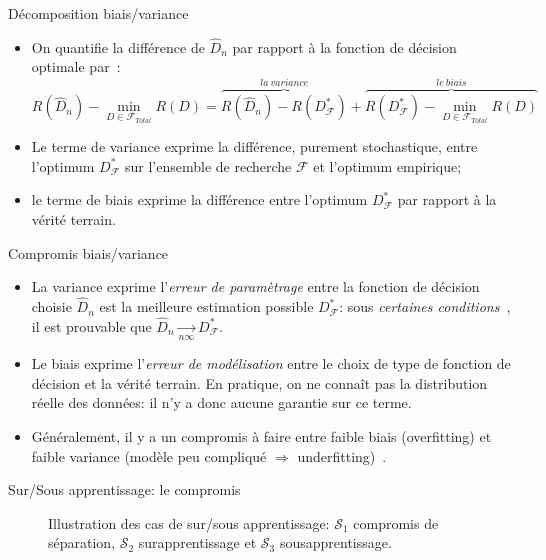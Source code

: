 \documentclass[8pt]{beamer}
\begin{document}
			\begin{frame}{Décomposition biais/variance}
				\begin{itemize}
					\item<1-> On quantifie la différence de \(\widehat D_n \) par rapport à la fonction de décision optimale par~\cite{tsybakovpoly}:
						\begin{equation}
							R(\widehat D_n) - \min_{D \in \mathscr{F}_{Total}} R(D) = \overbrace{R(\widehat D_n) - R(D^*_\mathscr{F})}^{la\ variance} + \overbrace{R(D^*_\mathscr{F}) - \min_{D \in \mathscr{F}_{Total}} R(D)}^{le\ biais}
						\end{equation}
					\item<2-> Le terme de variance exprime la différence, purement stochastique, entre l'optimum \(D^*_\mathscr{F}\) sur l'ensemble  de recherche \(\mathscr{F}\) et l'optimum empirique;
					\item<3-> le terme de biais exprime la différence entre l'optimum \(D^*_\mathscr{F}\) par rapport à la vérité terrain.
				\end{itemize}
			\end{frame}
			\begin{frame}{Compromis biais/variance}
				\begin{itemize}
					\item<1-> La variance exprime l'\textit{erreur de paramètrage} entre la fonction de décision choisie \(\widehat D_n\) est la meilleure estimation possible \(D^*_\mathscr{F}\): sous \textit{certaines conditions}~\cite{tsybakovpoly}, il est prouvable que \(\widehat D_n \underset{n\infty}{\longrightarrow} D^*_\mathscr{F}\).
					\item<2-> Le biais exprime l'\textit{erreur de modélisation} entre le choix de type de fonction de décision et la vérité terrain. En pratique, on ne connaît pas la distribution réelle des données: il n'y a donc aucune garantie sur ce terme.
					\item<3-> Généralement, il y a un compromis à faire entre faible biais (overfitting) et faible variance (modèle peu compliqué \(\Rightarrow\) underfitting)~\cite{tsybakovpoly}.
				\end{itemize}
			\end{frame}
			\begin{frame}[plain]{Sur/Sous apprentissage: le compromis}
				\begin{figure}[H]
					\begin{center}
						
						\vspace{-1em}
						\caption*{Illustration des cas de sur/sous apprentissage: $\mathscr{S}_1$ compromis de séparation, $\mathscr{S}_2$ surapprentissage et $\mathscr{S}_3$ sousapprentissage.}	
					\end{center}
				\end{figure}
			\end{frame}
\end{document}
